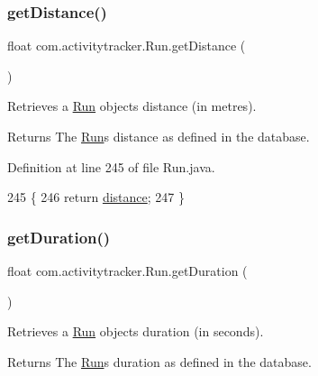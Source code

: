 \subsubsection{\texorpdfstring{get\+Distance()}{getDistance()}}
{\footnotesize\ttfamily float com.\+activitytracker.\+Run.\+get\+Distance (\begin{DoxyParamCaption}{ }\end{DoxyParamCaption})}

Retrieves a \mbox{\hyperlink{classcom_1_1activitytracker_1_1_run}{Run}} object\textquotesingle{}s distance (in metres).

\begin{DoxyReturn}{Returns}
The \mbox{\hyperlink{classcom_1_1activitytracker_1_1_run}{Run}}\textquotesingle{}s distance as defined in the database. 
\end{DoxyReturn}


Definition at line 245 of file Run.\+java.


\begin{DoxyCode}
245                                \{
246         \textcolor{keywordflow}{return} \mbox{\hyperlink{classcom_1_1activitytracker_1_1_run_a7b4ca8c4ecea4da1653f03b8c8fc16a8}{distance}};
247     \}
\end{DoxyCode}
\mbox{\label{classcom_1_1activitytracker_1_1_run_af0d3f62a282a94fe74a1bdfa0c3dc277}} 
\subsubsection{\texorpdfstring{get\+Duration()}{getDuration()}}
{\footnotesize\ttfamily float com.\+activitytracker.\+Run.\+get\+Duration (\begin{DoxyParamCaption}{ }\end{DoxyParamCaption})}

Retrieves a \mbox{\hyperlink{classcom_1_1activitytracker_1_1_run}{Run}} object\textquotesingle{}s duration (in seconds).

\begin{DoxyReturn}{Returns}
The \mbox{\hyperlink{classcom_1_1activitytracker_1_1_run}{Run}}\textquotesingle{}s duration as defined in the database. 
\end{DoxyReturn}



